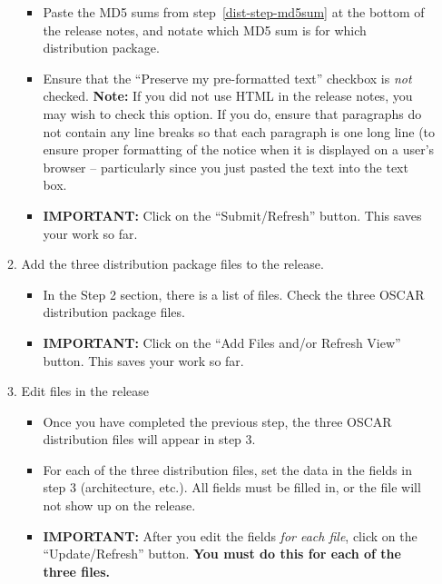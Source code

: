 \begin{enumerate}
\begin{enumerate}
\begin{itemize}
      \item Paste the MD5 sums from step~\ref{dist-step-md5sum} at the
        bottom of the release notes, and notate which MD5 sum is for
        which distribution package.

      \item Ensure that the ``Preserve my pre-formatted text''
        checkbox is {\em not} checked.  {\bf Note:} If you did not use
        HTML in the release notes, you may wish to check this option.
        If you do, ensure that paragraphs do not contain any line
        breaks so that each paragraph is one long line (to ensure
        proper formatting of the notice when it is displayed on a
        user's browser -- particularly since you just pasted the text
        into the text box.

      \item {\bf IMPORTANT:} Click on the ``Submit/Refresh'' button.
        This saves your work so far.
      \end{itemize}

  \item Add the three distribution package files to the release.

    \begin{itemize}
    \item In the Step 2 section, there is a list of files.  Check the
      three OSCAR distribution package files.
      
    \item {\bf IMPORTANT:} Click on the ``Add Files and/or Refresh
      View'' button.  This saves your work so far.
    \end{itemize}

  \item Edit files in the release

    \begin{itemize}
    \item Once you have completed the previous step, the three OSCAR
      distribution files will appear in step 3.
      
    \item For each of the three distribution files, set the data in
      the fields in step 3 (architecture, etc.).  All fields must be
      filled in, or the file will not show up on the release.  
      
    \item {\bf IMPORTANT:} After you edit the fields {\em for each
        file}, click on the ``Update/Refresh'' button.  {\bf You must
        do this for each of the three files.}
    \end{itemize}


\end{enumerate}
\end{enumerate}
